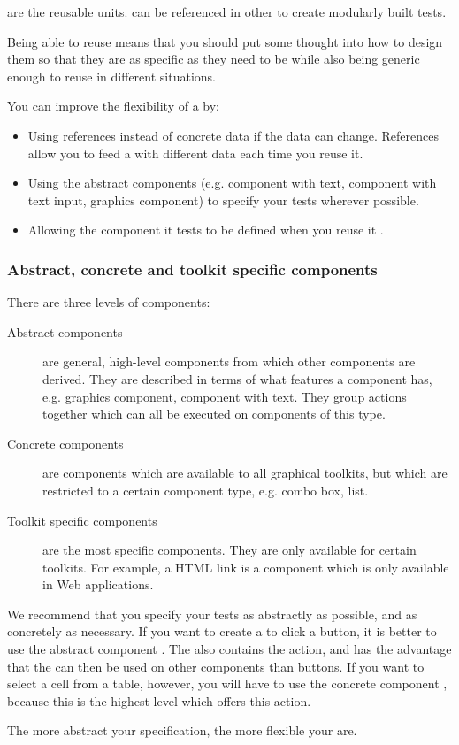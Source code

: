 \gdcases{} are the reusable units. \gdcases{} can be referenced in other \gdcases{} to create modularly built tests. 

Being able to reuse \gdcases{} means that you should put some thought into how to design them so that they are as specific as they need to be while also being generic enough to reuse in different situations. 

You can improve the flexibility of a \gdcase{} by:

\begin{itemize}
\item Using references  instead of concrete data if the data can change. References allow you to feed a \gdcase{} with different data each time you reuse it. 
\item Using the abstract components (e.g. component with text, component with text input, graphics component)  to specify your tests wherever possible. 
\item Allowing the component it tests to be defined when you reuse it . 
\end{itemize}


\subsubsection{Abstract, concrete and toolkit specific components}
\label{ConceptsAbstractComps}

There are three levels of components:
\begin{description}
\item [Abstract components]{are general, high-level components from which other components are derived. They are described in terms of what features a component has, e.g. graphics component, component with text. They group actions together which can all be executed on components of this type.}
\item [Concrete components]{are components which are available to all graphical toolkits, but which are restricted to a certain component type, e.g. combo box, list.}
\item [Toolkit specific components]{are the most specific components. They are only available for certain toolkits. For example, a HTML link is a component which is only available in Web applications.}
\end{description}

We recommend that you specify your tests as abstractly as possible, and as concretely as necessary. If you want to create a \gdcase{} to click a button, it is better to use the abstract component . The  also contains the  action, and has the advantage that the \gdcase{} can then be used on other components than buttons. If you want to select a cell from a table, however, you will have to use the concrete component , because this is the highest level which offers this action. 

The more abstract your specification, the more flexible your \gdcases{} are. 


